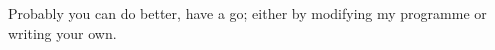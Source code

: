 \documentclass[11pt,a4paper]{scrartcl}
\begin{document}
\begin{center}
\end{center}
Probably you can do better, have a go; either by modifying my
programme or writing your own.
\end{document}
